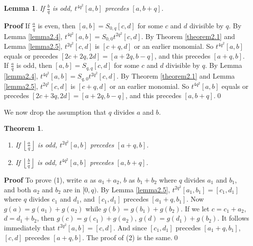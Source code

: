 \documentclass{monsky2009}
\newenvironment{proof}[1][]{\textbf{Proof #1\hspace{.3em}}}{}
\newtheorem{theorem}[definition]{Theorem}
\newtheorem{lemma}[definition]{Lemma}
\begin{document}
\begin{lemma}%
\label{lemma2.6}
If $\frac{b}{q}$ is odd, $t^{4q^{2}}[a,b]$ precedes $[a,b+q]$.
\end{lemma}

\begin{proof}
If $\frac{a}{q}$ is even, then $[a,b]= S_{0,q}[c,d]$ for some $c$ and $d$ divisible by $q$. By Lemma \ref{lemma2.4}, $t^{4q^{2}}[a,b]=S_{0,0}t^{2q^{2}}[c,d]$. By Theorem \ref{theorem2.1} and Lemma \ref{lemma2.5}, $t^{2q^{2}}[c,d]$ is $[c+q,d]$ or an earlier monomial. So $t^{4q^{2}}[a,b]$ equals or precedes $[2c+2q,2d]=[a+2q, b-q]$, and this precedes $[a+q,b]$. If $\frac{a}{q}$ is odd, then $[a,b]= S_{q,q}[c,d]$ for some $c$ and $d$ divisible by $q$. By Lemma \ref{lemma2.4}, $t^{4q^{2}}[a,b]=S_{q,0}t^{2q^{2}}[c,d]$. By Theorem \ref{theorem2.1} and Lemma \ref{lemma2.5}, $t^{2q^{2}}[c,d]$ is $[c+q,d]$ or an earlier monomial. So $t^{4q^{2}}[a,b]$ equals or precedes $[2c+3q,2d]=[a+2q, b-q]$, and this precedes $[a,b+q]$.\qed
\end{proof}

We now drop the assumption that $q$ divides $a$ and $b$.

\begin{theorem}
\label{theorem2.7} \hspace{1em}\\%
\vspace{-3ex}
\begin{enumerate}
\item[(1)] If $\left\lfloor\frac{a}{q}\right\rfloor$ is odd, $t^{2q^{2}}[a,b]$ precedes $[a+q,b]$.
\item[(2)] If $\left\lfloor\frac{b}{q}\right\rfloor$ is odd, $t^{4q^{2}}[a,b]$ precedes $[a,b+q]$.
\end{enumerate}
\end{theorem}

\begin{proof}
To prove (1), write $a$ as $a_{1}+a_{2}$, $b$ as $b_{1}+b_{2}$ where $q$ divides $a_{1}$ and $b_{1}$, and both $a_{2}$ and $b_{2}$ are in $[0,q)$. By Lemma \ref{lemma2.5}, $t^{2q^{2}}[a_{1},b_{1}]=[c_{1},d_{1}]$ where $q$ divides $c_{1}$ and $d_{1}$, and $[c_{1},d_{1}]$ precedes $[a_{1}+q,b_{1}]$. Now $g(a)=g(a_{1})+g(a_{2})$ while $g(b)=g(b_{1})+g(b_{2})$. If we let $c=c_{1}+a_{2}$, $d=d_{1}+b_{2}$, then $g(c)=g(c_{1})+g(a_{2})$, $g(d)=g(d_{1})+g(b_{2})$. It follows immediately that  $t^{2q^{2}}[a,b]=[c,d]$. And since $[c_{1},d_{1}]$ precedes $[a_{1}+q,b_{1}]$, $[c,d]$ precedes $[a+q,b]$. The proof of (2) is the same.\qed
\end{proof}
\end{document}
